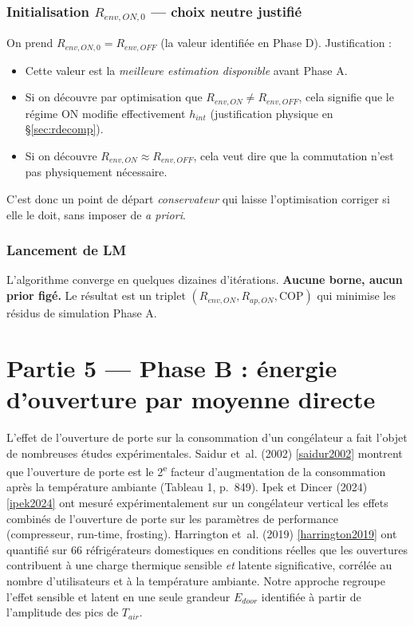 \documentclass[11pt,a4paper]{article}
\begin{document}
\subsubsection*{Initialisation $R_{env,ON,0}$ — choix neutre justifié}

On prend $R_{env,ON,0} = R_{env,OFF}$ (la valeur identifiée en Phase D). Justification :
\begin{itemize}[itemsep=0pt]
\item Cette valeur est la \emph{meilleure estimation disponible} avant Phase A.
\item Si on découvre par optimisation que $R_{env,ON} \neq R_{env,OFF}$, cela signifie que
le régime ON modifie effectivement $h_{int}$ (justification physique en \S\ref{sec:rdecomp}).
\item Si on découvre $R_{env,ON} \approx R_{env,OFF}$, cela veut dire que la commutation
n'est pas physiquement nécessaire.
\end{itemize}
C'est donc un point de départ \emph{conservateur} qui laisse l'optimisation corriger si
elle le doit, sans imposer de \emph{a priori}.

\subsubsection*{Lancement de LM}

L'algorithme converge en quelques dizaines d'itérations. \textbf{Aucune borne, aucun prior
figé.} Le résultat est un triplet $(R_{env,ON}, R_{ap,ON}, \mathrm{COP})$ qui minimise
les résidus de simulation Phase A.

\section{Partie 5 — Phase B : énergie d'ouverture par moyenne directe}

L'effet de l'ouverture de porte sur la consommation d'un congélateur a fait l'objet de
nombreuses études expérimentales. Saidur et~al. (2002) \ref{saidur2002} montrent que
l'ouverture de porte est le 2\textsuperscript{e} facteur d'augmentation de la consommation
après la température ambiante (Tableau 1, p.~849). Ipek et Dincer (2024) \ref{ipek2024}
ont mesuré expérimentalement sur un congélateur vertical les effets combinés de l'ouverture
de porte sur les paramètres de performance (compresseur, run-time, frosting). Harrington
et~al. (2019) \ref{harrington2019} ont quantifié sur 66 réfrigérateurs domestiques en
conditions réelles que les ouvertures contribuent à une charge thermique sensible \emph{et}
latente significative, corrélée au nombre d'utilisateurs et à la température ambiante.
Notre approche regroupe l'effet sensible et latent en une seule grandeur $E_{door}$
identifiée à partir de l'amplitude des pics de $T_{air}$.
\end{document}
